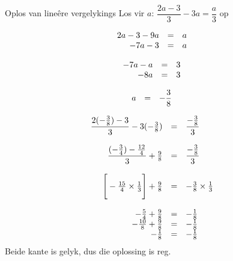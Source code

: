 \begin{wex}
{Oplos van lineêre vergelykings}
{Los vir $a$: $\dfrac{2a-3}{3}-3a=\dfrac{a}{3}$ op}
{

\begin{equation*}
    \begin{array}{cccc}\hfill 2a-3 - 9a &= &a\hfill & \\ 
\hfill -7a - 3 &= &a\hfill & 
    \end{array}
\end{equation*}

\begin{equation*}
    \begin{array}{cccc}\hfill -7a -a &= &3\hfill & \\ 
\hfill -8a &= &3\hfill & \\
    \end{array}
\end{equation*}

\begin{equation*}
    \begin{array}{cccc}\hfill a &= & -\dfrac{3}{8}\hfill & \\ 

    \end{array}
\end{equation*}

\begin{equation*}
    \begin{array}{ccll}\hfill \dfrac{2(-\frac{3}{8}) - 3}{3} - 3(-\frac{3}{8}) &= & \dfrac{-\frac{3}{8}}{3}\hfill & \\ 
\\
      \hfill \dfrac{(-\frac{3}{4}) - \frac{12}{4}}{3} + \frac{9}{8} &= & \dfrac{-\frac{3}{8}}{3}\hfill & \\ 
\\
 \hfill \Bigg[-\frac{15}{4} \times \frac{1}{3}\Bigg] + \frac{9}{8} &= & -\frac{3}{8} \times \frac{1}{3}\hfill & \\ 
\\
 \hfill -\frac{5}{4} + \frac{9}{8} &= & -\frac{1}{8}\hfill & \\ 
 \hfill -\frac{10}{8} + \frac{9}{8} &= & -\frac{1}{8}\hfill & \\ 
 \hfill -\frac{1}{8} &= & -\frac{1}{8}\hfill & 
    \end{array}
\end{equation*}
Beide kante is gelyk, dus die oplossing is reg.
}
\end{wex}


